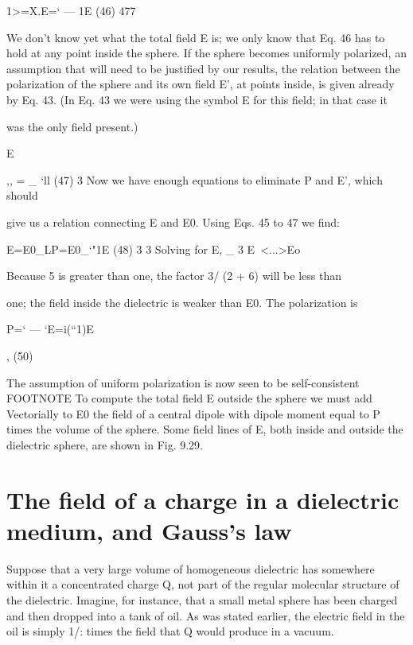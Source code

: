 \begin{equation}
\end{equation}
1>=X.E=‘ --- 1E (46)
477

We don't know yet what the total field E is; we only know that
Eq. 46 has to hold at any point inside the sphere. If the sphere becomes
uniformly polarized, an assumption that will need to be
justified by our results, the relation between the polarization of the
sphere and its own field E', at points inside, is given already by Eq. 43.
(In Eq. 43 we were using the symbol E for this field; in that case it

was the only field present.)

\begin{equation}
\end{equation}
E{,, = _ ‘ll (47)
3
Now we have enough equations to eliminate P and E', which should

give us a relation connecting E and E0. Using Eqs. 45 to 47 we find:

\begin{equation}
\end{equation}
E=E0_LP=E0_‘"1E (48)
3 3
Solving for E,
_ 3
E~<...>Eo 

Because 5 is greater than one, the factor 3/ (2 + 6) will be less than

one; the field inside the dielectric is weaker than E0. The polarization
is

\begin{equation}
\end{equation}
P=‘ --- ‘E=i(``1)E{, (50)

The assumption of uniform polarization is now seen to be self-consistent
        FOOTNOTE
To compute the total field E outside the sphere we must
add Vectorially to E0 the field of a central dipole with dipole moment
equal to P times the volume of the sphere. Some field lines of E,
both inside and outside the dielectric sphere, are shown in Fig. 9.29.

\section{The field of a charge in a dielectric medium, and Gauss's law}

Suppose that a very large volume of homogeneous dielectric has
somewhere within it a concentrated charge Q, not part of the regular
molecular structure of the dielectric. Imagine, for instance, that a
small metal sphere has been charged and then dropped into a tank
of oil. As was stated earlier, the electric field in the oil is simply 1/:
times the field that Q would produce in a vacuum.

}}

